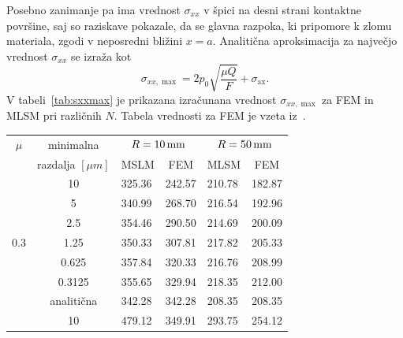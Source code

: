 \documentclass[12pt,a4paper,twoside]{article}
\theoremstyle{definition} %
\theoremstyle{plain} %
\numberwithin{equation}{section}
\newcommand{\ts}{\sigma}
\newcommand{\sax}{\ensuremath{\sigma_{\text{ax}}}}
\begin{document}
Posebno zanimanje pa ima vrednost $\ts_{xx}$ v špici na desni strani kontaktne površine,
saj so raziskave pokazale, da se glavna razpoka, ki pripomore k zlomu materiala, zgodi v neposredni
bližini $x = a$. Analitična aproksimacija za največjo vrednost $\ts_{xx}$ se izraža kot
\[
  \ts_{xx, \max} = 2 p_0 \sqrt{\frac{\mu Q}{F}} + \sax.
\]
V tabeli~\ref{tab:sxxmax} je prikazana izračunana vrednost $\ts_{xx, \max}$ za FEM in MLSM
pri različnih $N$. Tabela vrednosti za FEM je vzeta iz~\cite[tabela 3]{pereira2016convergence}.
\begin{table}[h]
  \centering
  \begin{tabular}{ccllll} \hline
    \multicolumn{1}{c}{$\mu$} & minimalna        & \multicolumn{2}{c}{$R=\unit[10]{mm}$}              & \multicolumn{2}{c}{$R=\unit[50]{mm}$}              \\ \cline{3-6}
    & razdalja $[\unit{\mu m}]$ & \multicolumn{1}{c}{MSLM} & \multicolumn{1}{c}{FEM} & \multicolumn{1}{c}{MLSM} & \multicolumn{1}{c}{FEM} \\ \hline \hline
                              & 10                 & 325.36                   & 242.57                  & 210.78                   & 182.87                  \\
                              & 5                  & 340.99                   & 268.70                  & 216.54                   & 192.96                  \\
                              & 2.5                & 354.46                   & 290.50                  & 214.69                   & 200.09                  \\
    0.3                       & 1.25               & 350.33                   & 307.81                  & 217.82                   & 205.33                  \\
                              & 0.625              & 357.84                   & 320.33                  & 216.76                   & 208.99                  \\
                              & 0.3125             & 355.65                   & 329.94                  & 218.35                   & 212.00                  \\ \cline{2-6}
                              & analitična         & 342.28                   & 342.28                  & 208.35                   & 208.35                  \\ \hline
                              & 10                 & 479.12                   & 349.91                  & 293.75                   & 254.12                  \\

\end{tabular}
\end{table}
\end{document}
